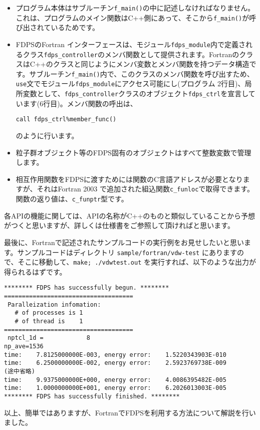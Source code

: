 \documentclass[twocolumn,10pt]{jarticle}
\begin{document}
\begin{itemize}
\item プログラム本体はサブルーチン\texttt{f\_main()}の中に記述しなければなりません。これは、プログラムのメイン関数はC++側にあって、そこから\texttt{f\_main()}が呼び出されているためです。
\item FDPSのFortran インターフェースは、モジュール\texttt{fdps\_module}内で定義されるクラス\texttt{fdps\_controller}のメンバ関数として提供されます。FortranのクラスはC++のクラスと同じようにメンバ変数とメンバ関数を持つデータ構造です。サブルーチン\texttt{f\_main()}内で、このクラスのメンバ関数を呼び出すため、\texttt{use}文でモジュール\texttt{fdps\_module}にアクセス可能にし(プログラム 2行目)、局所変数として、\texttt{fdps\_controller}クラスのオブジェクト\texttt{fdps\_ctrl}を宣言しています(6行目)。メンバ関数の呼出は、
\begin{verbatim}
call fdps_ctrl%member_func()  
\end{verbatim}
のように行います。
\item 粒子群オブジェクト等のFDPS固有のオブジェクトはすべて整数変数で管理します。
\item 相互作用関数をFDPSに渡すためには関数のC言語アドレスが必要となりますが、それはFortran 2003 で追加された組込関数\texttt{c\_funloc}で取得できます。関数の返り値は、\texttt{c\_funptr}型です。
\end{itemize}

各APIの機能に関しては、APIの名称がC++のものと類似していることから予想がつくと思いますが、詳しくは仕様書をご参照して頂ければと思います。

最後に、Fortranで記述されたサンプルコードの実行例をお見せしたいと思います。サンプルコードはディレクトリ \texttt{sample/fortran/vdw-test} にありますので、そこに移動して、\texttt{make; ./vdwtest.out} を実行すれば、以下のような出力が得られるはずです。
{\scriptsize
\begin{verbatim}
******** FDPS has successfully begun. ********
====================================
 Paralleization infomation:
   # of processes is 1
   # of thread is    1
====================================
 nptcl_1d =            8
np_ave=1536
time:    7.8125000000E-003, energy error:    1.5220343903E-010
time:    6.2500000000E-002, energy error:    2.5923769738E-009
(途中省略)
time:    9.9375000000E+000, energy error:    4.0086395482E-005
time:    1.0000000000E+001, energy error:    6.2026013003E-005
******** FDPS has successfully finished. ********
\end{verbatim}
}\noindent
以上、簡単ではありますが、FortranでFDPSを利用する方法について解説を行いました。
\end{document}
